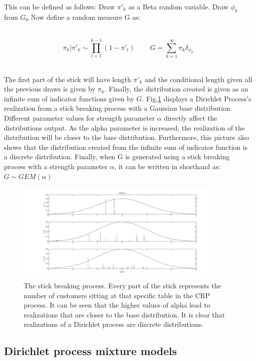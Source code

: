 \documentclass[twoside,hidelinks]{article}
\begin{document}
This can be defined as follows: Draw $\pi'_k$ as a Beta random variable. Draw $\phi_k$ from $G_0$ Now define a random measure G as:


\ \
\begin{equation}
\pi_k  | \pi'_k \sim \prod_{l=1}^{k-1}(1- \pi'_l) \ \ \ \ \ \ \ \ \ \     G = \sum_{k=1}^\infty \pi_k \delta_{\phi_k} 
\end{equation}
\ \

The first part of the stick will have length $\pi'_k$ and the conditional length given all the previous draws is given by $\pi_k$. Finally, the distribution created is given as an infinite sum of indicator functions given by $G$. Fig.\ref{crpGausBase} displays a Dirichlet Process's realization from a stick breaking process with a Gaussian base distribution. Different parameter values for strength parameter $\alpha$ directly affect the distributions output. As the alpha parameter is increased, the realization of the distribution will be closer to the base distribution. Furthermore, this picture also shows that the distribution created from the infinite sum of indicator function is a discrete distribution. Finally, when G is generated using a stick breaking process with a strength parameter $\alpha$, it can be written in shorthand as: $ G \sim GEM(\alpha) $

\begin{figure}[h!]
          \centerline{\includegraphics[width=0.91\textwidth]{stickBreakGaus}}
	\caption{The stick breaking process. Every part of the stick represents the number of customers sitting at that specific table in the CRP process. It can be seen that the higher values of alpha lead to realizations that are closer to the base distribution. It is clear that realizations of a Dirichlet process are discrete distributions.}
	\label{crpGausBase}
\end{figure}

\subsection{Dirichlet process mixture models}
\end{document}
